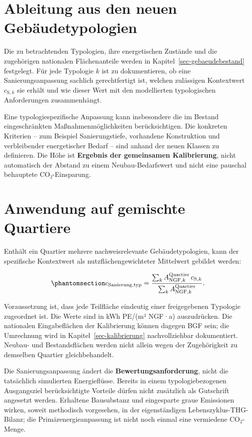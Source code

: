 \documentclass[
  ngerman,
  a4paper,
  DIV=11]{scrreprt}
\begin{document}
\section{Ableitung aus den neuen
Gebäudetypologien}\label{ableitung-aus-den-neuen-gebuxe4udetypologien}

Die zu betrachtenden Typologien, ihre energetischen Zustände und die
zugehörigen nationalen Flächenanteile werden in
Kapitel~\ref{sec-gebaeudebestand} festgelegt. Für jede Typologie \(k\)
ist zu dokumentieren, ob eine Sanierungsanpassung sachlich
gerechtfertigt ist, welchen zulässigen Kontextwert \(c_{\mathrm{S},k}\)
sie erhält und wie dieser Wert mit den modellierten typologischen
Anforderungen zusammenhängt.

Eine typologiespezifische Anpassung kann insbesondere die im Bestand
eingeschränkten Maßnahmenmöglichkeiten berücksichtigen. Die konkreten
Kriterien -- zum Beispiel Sanierungstiefe, vorhandene Konstruktion und
verbleibender energetischer Bedarf -- sind anhand der neuen Klassen zu
definieren. Die Höhe ist \textbf{Ergebnis der gemeinsamen Kalibrierung},
nicht automatisch der Abstand zu einem Neubau-Bedarfswert und nicht eine
pauschal behauptete CO₂-Einsparung.

\section{Anwendung auf gemischte
Quartiere}\label{anwendung-auf-gemischte-quartiere}

Enthält ein Quartier mehrere nachweisrelevante Gebäudetypologien, kann
der spezifische Kontextwert als nutzflächengewichteter Mittelwert
gebildet werden:

\begin{equation}\protect\phantomsection\label{eq-sanierungskontext}{
c_{\mathrm{Sanierung,typ}}=
\frac{\sum_k A_{\mathrm{NGF},k}^{\mathrm{Quartier}}\,c_{\mathrm{S},k}}
{\sum_k A_{\mathrm{NGF},k}^{\mathrm{Quartier}}}.
}\end{equation}

Voraussetzung ist, dass jede Teilfläche eindeutig einer freigegebenen
Typologie zugeordnet ist. Die Werte sind in kWh PE/(m² NGF·a)
auszudrücken. Die nationalen Eingabeflächen der Kalibrierung können
dagegen BGF sein; die Umrechnung wird in Kapitel~\ref{sec-kalibrierung}
nachvollziehbar dokumentiert. Neubau- und Bestandsflächen werden nicht
allein wegen der Zugehörigkeit zu demselben Quartier gleichbehandelt.

Die Sanierungsanpassung ändert die \textbf{Bewertungsanforderung}, nicht
die tatsächlich simulierten Energieflüsse. Bereits in einem
typologiebezogenen Ausgangsziel berücksichtigte Vorteile dürfen nicht
zusätzlich als Gutschrift angesetzt werden. Erhaltene Bausubstanz und
eingesparte graue Emissionen wirken, soweit methodisch vorgesehen, in
der eigenständigen Lebenszyklus-THG-Bilanz; die Primärenergieanpassung
ist nicht noch einmal eine vermiedene CO₂-Menge.
\end{document}
